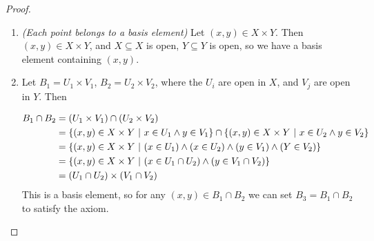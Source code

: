 \documentclass[12pt, twosided]{article}
\begin{document}
\begin{proof}
  \begin{enumerate}
  \item \textit{(Each point belongs to a basis element)} Let \((x, y) \in X \times Y\). Then \((x, y) \in X \times Y\), and \(X \subseteq X\) is open, \(Y \subseteq Y\) is open, so we have a basis element containing \((x, y)\).
  \item Let \(B_1 = U_1 \times V_1\), \(B_2 = U_2 \times V_2\), where the \(U_i\) are open in \(X\), and \(V_j\) are open in \(Y\). Then

    \begin{align*}
      B_1 \cap B_2 &= (U_1 \times V_1) \cap (U_2 \times V_2) \\
                   &= \left\{ (x, y) \in X \times Y \ \middle\vert\  x \in U_1 \wedge y \in V_1 \right\} \cap \left\{ (x, y) \in X \times Y \ \middle\vert\  x \in U_2 \wedge y \in V_2 \right\} \\
                   &= \left\{ (x, y) \in X \times Y \ \middle\vert\  (x \in U_1) \wedge (x \in U_2) \wedge (y \in V_1) \wedge (Y \in V_2) \right\} \\
                   &= \left\{ (x, y) \in X \times Y \ \middle\vert\  (x \in U_1 \cap U_2) \wedge (y \in V_1 \cap V_2) \right\} \\
                   &= (U_1 \cap U_2) \times (V_1 \cap V_2)
    \end{align*}
    This is a basis element, so for any \((x, y) \in B_1 \cap B_2\) we can set \(B_3 = B_1 \cap B_2\) to satisfy the axiom.
  \end{enumerate}
\end{proof}
\end{document}
